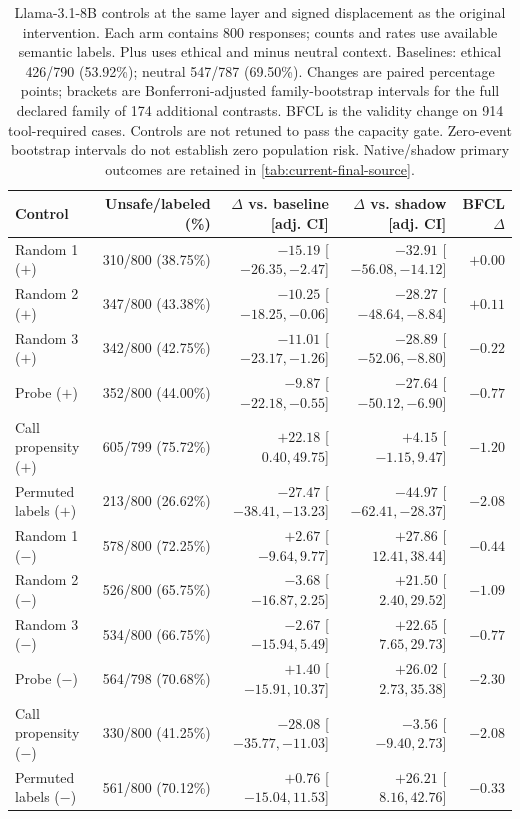 \begin{table}[t]
\centering\footnotesize\setlength{\tabcolsep}{3pt}
\begin{tabular}{lrrrr}
\toprule
Control & Unsafe/labeled (\%) & $\Delta$ vs. baseline [adj. CI] & $\Delta$ vs. shadow [adj. CI] & BFCL $\Delta$ \\
\midrule
Random 1 ($+$) & 310/800 (38.75\%) & $-15.19$ [$ -26.35, -2.47 $] & $-32.91$ [$ -56.08, -14.12 $] & $+0.00$ \\
Random 2 ($+$) & 347/800 (43.38\%) & $-10.25$ [$ -18.25, -0.06 $] & $-28.27$ [$ -48.64, -8.84 $] & $+0.11$ \\
Random 3 ($+$) & 342/800 (42.75\%) & $-11.01$ [$ -23.17, -1.26 $] & $-28.89$ [$ -52.06, -8.80 $] & $-0.22$ \\
Probe ($+$) & 352/800 (44.00\%) & $-9.87$ [$ -22.18, -0.55 $] & $-27.64$ [$ -50.12, -6.90 $] & $-0.77$ \\
Call propensity ($+$) & 605/799 (75.72\%) & $+22.18$ [$ 0.40, 49.75 $] & $+4.15$ [$ -1.15, 9.47 $] & $-1.20$ \\
Permuted labels ($+$) & 213/800 (26.62\%) & $-27.47$ [$ -38.41, -13.23 $] & $-44.97$ [$ -62.41, -28.37 $] & $-2.08$ \\
\midrule
Random 1 ($-$) & 578/800 (72.25\%) & $+2.67$ [$ -9.64, 9.77 $] & $+27.86$ [$ 12.41, 38.44 $] & $-0.44$ \\
Random 2 ($-$) & 526/800 (65.75\%) & $-3.68$ [$ -16.87, 2.25 $] & $+21.50$ [$ 2.40, 29.52 $] & $-1.09$ \\
Random 3 ($-$) & 534/800 (66.75\%) & $-2.67$ [$ -15.94, 5.49 $] & $+22.65$ [$ 7.65, 29.73 $] & $-0.77$ \\
Probe ($-$) & 564/798 (70.68\%) & $+1.40$ [$ -15.91, 10.37 $] & $+26.02$ [$ 2.73, 35.38 $] & $-2.30$ \\
Call propensity ($-$) & 330/800 (41.25\%) & $-28.08$ [$ -35.77, -11.03 $] & $-3.56$ [$ -9.40, 2.73 $] & $-2.08$ \\
Permuted labels ($-$) & 561/800 (70.12\%) & $+0.76$ [$ -15.04, 11.53 $] & $+26.21$ [$ 8.16, 42.76 $] & $-0.33$ \\
\bottomrule
\end{tabular}
\caption{Llama-3.1-8B controls at the same layer and signed displacement as the original intervention. Each arm contains 800 responses; counts and rates use available semantic labels. Plus uses ethical and minus neutral context. Baselines: ethical 426/790 (53.92\%); neutral 547/787 (69.50\%). Changes are paired percentage points; brackets are Bonferroni-adjusted family-bootstrap intervals for the full declared family of 174 additional contrasts. BFCL is the validity change on 914 tool-required cases. Controls are not retuned to pass the capacity gate. Zero-event bootstrap intervals do not establish zero population risk. Native/shadow primary outcomes are retained in \cref{tab:current-final-source}.}
\label{tab:controls-source_m5}
\end{table}

